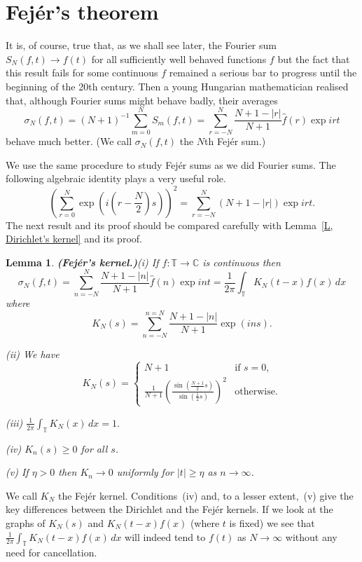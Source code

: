 \documentclass[12pt]{article}
\newtheorem{lemma}[theorem]{Lemma}
\theoremstyle{definition}
\begin{document}
\section{Fej\'{e}r's theorem} It is, of course, true that,
as we shall see later, the Fourier sum $S_{N}(f,t)\rightarrow f(t)$
for all sufficiently well behaved functions $f$ but
the fact that this result fails for some continuous $f$
remained a serious bar to progress until the beginning
of the 20th century. Then a young Hungarian 
mathematician realised that, although Fourier sums might
behave badly, their averages
\[\sigma_{N}(f,t)=(N+1)^{-1}\sum_{m=0}^{N}S_{m}(f,t)
=\sum_{r=-N}^{N}\frac{N+1-|r|}{N+1}\hat{f}(r)\exp irt\]
behave much better. (We call $\sigma_{N}(f,t)$ the
$N$th Fej\'{e}r sum.) 

We use the same procedure to study Fej\'{e}r sums
as we did Fourier sums. The following algebraic
identity plays a very useful role.
\[\left(\sum_{r=0}^{N}\exp\left( i(r-\frac{N}{2})s\right)\right)^{2}
=\sum_{r=-N}^{N}(N+1-|r|)\exp irt.\]
The next result and its proof should be compared carefully
with Lemma~\ref{L, Dirichlet's kernel} and its proof.


\begin{lemma}{\bf (Fej\'{e}r's kernel.)}\label{L, Fejer's kernel}  
(i) If $f:{\mathbb T}\rightarrow{\mathbb C}$ is continuous then
\[\sigma_{N}(f,t)=\sum_{n=-N}^{N}\frac{N+1-|n|}{N+1}\hat{f}(n)\exp int=
\frac{1}{2\pi}\int_{\mathbb T}K_{N}(t-x)f(x)\,dx\]
where
\[K_{N}(s)=\sum_{n=-N}^{n=N}\frac{N+1-|n|}{N+1}\exp(ins).\]

(ii) We have
\begin{equation*}
K_{N}(s)=
\begin{cases}N+1&\text{if $s=0$,}\\
\frac{1}{N+1}\left(\frac{\sin(\tfrac{N+1}{2}s)}
{\sin(\tfrac{1}{2}s)}\right)^{2}&\text{otherwise.}
\end{cases}
\end{equation*}

(iii) ${\displaystyle \frac{1}{2\pi}\int_{\mathbb T}K_{N}(x)\,dx=1.}$

(iv) $K_{n}(s)\geq 0$ for all $s$.

(v) If $\eta>0$ then $K_{n}\rightarrow 0$ uniformly
for $|t|\geq \eta$
as $n\rightarrow\infty$.
\end{lemma}
We call $K_{N}$ the Fej\'{e}r kernel.
Conditions~(iv) and, to a lesser extent,~(v)
give the key differences between the Dirichlet
and the Fej\'{e}r kernels. 
If we look at the graphs of $K_{N}(s)$ and $K_{N}(t-x)f(x)$
(where $t$ is fixed) we see that
$\frac{1}{2\pi}\int_{\mathbb T}K_{N}(t-x)f(x)\,dx$
will indeed tend to $f(t)$ as $N\rightarrow\infty$
without any need for cancellation.
\end{document}
